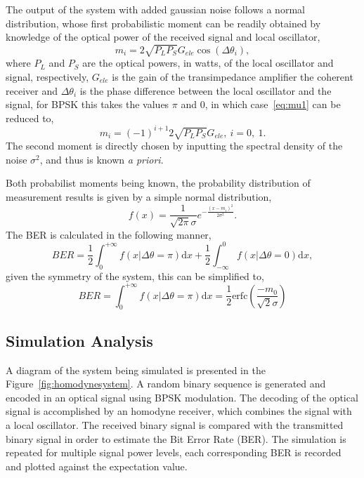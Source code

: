 The output of the system with added gaussian noise follows a normal distribution, whose first probabilistic moment can be readily obtained by knowledge of the optical power of the received signal and local oscillator,
\begin{equation}\label{eq:mu1}
m_i=2\sqrt{P_LP_S}G_{ele}\cos(\Delta\theta_i),
\end{equation}
where $P_L$ and $P_S$ are the optical powers, in watts, of the local oscillator and signal, respectively, $G_{ele}$ is the gain of the transimpedance amplifier the coherent receiver and $\Delta\theta_i$ is the phase difference between the local oscillator and the signal, for BPSK this takes the values $\pi$ and 0, in which case~\eqref{eq:mu1} can be reduced to,
\begin{equation}
m_i=(-1)^{i+1}2\sqrt{P_LP_S}G_{ele},~i=0,~1.
\end{equation}
The second moment is directly chosen by inputting the spectral density of the noise $\sigma^2$, and thus is known \textit{a priori}.
\par
Both probabilist moments being known, the probability distribution of measurement results is given by a simple normal distribution,
\begin{equation}
f(x)=\frac{1}{\sqrt{2\pi}\sigma}e^{-\frac{(x-m_i)^2}{2\sigma^2}}.
\end{equation}
The BER is calculated in the following manner,
\begin{equation}
BER=\frac{1}{2}\int_0^{+\infty}f(x|\Delta\theta=\pi)\text{d}x+\frac{1}{2}\int^0_{-\infty}f(x|\Delta\theta=0)\text{d}x,
\end{equation}
given the symmetry of the system, this can be simplified to,
\begin{equation}\label{eq:BERtheoretical}
BER=\int_0^{+\infty}f(x|\Delta\theta=\pi)\text{d}x=\frac{1}{2}\text{erfc}\left(\frac{-m_0}{\sqrt{2}\sigma}\right)
\end{equation}

\subsection{Simulation Analysis}

A diagram of the system being simulated is presented in the Figure~\ref{fig:homodynesystem}. A random binary sequence is generated and encoded in an optical signal using BPSK modulation. The decoding of the optical signal is accomplished by an homodyne receiver, which combines the signal with a local oscillator. The received binary signal is compared with the transmitted binary signal in order to estimate the Bit Error Rate (BER). The simulation is repeated for multiple signal power levels, each corresponding BER is recorded and plotted against the expectation value.

